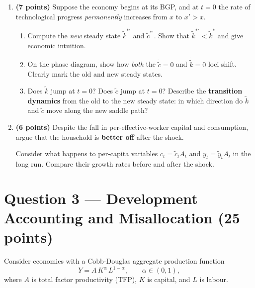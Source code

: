 \documentclass[a4paper,11pt]{article}
\newcommand{\ktilde}{\tilde{k}}
\newcommand{\ytilde}{\tilde{y}}
\newcommand{\ctilde}{\tilde{c}}
\begin{document}
\begin{enumerate}[label=\textbf{\arabic*.}, leftmargin=*, itemsep=6pt]
    \item \textbf{(7 points)}
    Suppose the economy begins at its BGP, and at $t=0$ the rate of technological
    progress \emph{permanently} increases from $x$ to $x' > x$.
    \begin{enumerate}[label=(\alph*), itemsep=4pt]
        \item Compute the \emph{new} steady state $\ktilde^{*\prime}$ and
        $\ctilde^{*\prime}$.  Show that $\ktilde^{*\prime} < \ktilde^*$ and give economic
        intuition.
        \item On the phase diagram, show how \emph{both} the $\dot{\ctilde}=0$ and
        $\dot{\ktilde}=0$ loci shift.  Clearly mark the old and new steady states.
        \item Does $\ktilde$ jump at $t=0$?  Does $\ctilde$ jump at $t=0$?  Describe the
        \textbf{transition dynamics} from the old to the new steady state: in which
        direction do $\ktilde$ and $\ctilde$ move along the new saddle path?
    \end{enumerate}

    \item \textbf{(6 points)}
    Despite the fall in per-effective-worker capital and consumption, argue that the
    household is \textbf{better off} after the shock.

    \begin{hintbox}
        Consider what happens to per-capita variables $c_t = \ctilde_t A_t$ and
        $y_t = \ytilde_t A_t$ in the long run.  Compare their growth rates before and
        after the shock.
    \end{hintbox}

\end{enumerate}

\clearpage

\section{Question 3 --- Development Accounting and Misallocation
\hfill (25 points)}

Consider economies with a Cobb-Douglas aggregate production function
\[
    Y = A\,K^{\alpha}\,L^{1-\alpha},\qquad \alpha \in (0,1),
\]
where $A$ is total factor productivity (TFP), $K$ is capital, and $L$ is labour.

\bigskip
\end{document}
